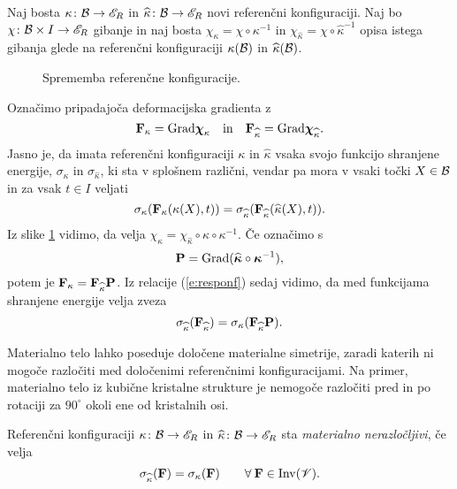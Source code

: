 Naj bosta $\kappa\colon\mathcal B\to\mathscr E_R$ in $\widehat{\kappa}\colon\mathcal B\to\mathscr E_R$ novi referenčni konfiguraciji.
Naj bo $\chi\colon\mathcal B\times I\to\mathscr E_R$ gibanje in naj bosta
$\chi_{\kappa}=\chi\circ\kappa^{-1}$ in $\chi_{\widehat{\kappa}}=\chi\circ\widehat{\kappa}^{-1}$
opisa istega gibanja glede na referenčni konfiguraciji $\kappa(\mathcal B)$ in $\widehat{\kappa}(\mathcal B)$.
\begin{figure}[h] \begin{center}
	
	\caption{Sprememba referenčne konfiguracije.}
	\label{pic:diagram}
\end{center} \end{figure}
Označimo pripadajoča deformacijska gradienta z
\[
	\mathbf F_{\kappa}=\mathrm{Grad}\boldsymbol \chi_{\kappa}\quad \mathrm{in}\quad
	\mathbf F_{\widehat{\kappa}}=\mathrm{Grad}\boldsymbol \chi_{\widehat{\kappa}}.
\]
Jasno je, da imata referenčni konfiguraciji $\kappa$ in $\widehat{\kappa}$ vsaka
svojo funkcijo shranjene energije, $\sigma_{\kappa}$ in $\sigma_{\widehat{\kappa}}$,
ki sta v splošnem različni, vendar pa mora v vsaki točki $X\in\mathcal B$ in za vsak $t\in I$ veljati
\begin{equation} \label{e:responf}
	\sigma_{\kappa}(\mathbf F_{\kappa}(\kappa(X),t))
	=\sigma_{\widehat{\kappa}}(\mathbf F_{\widehat{\kappa}}(\widehat{\kappa}(X),t)).
\end{equation}
Iz slike \ref{pic:diagram} vidimo, da velja $\chi_{\kappa}=\chi_{\widehat{\kappa}}\circ\widehat{\kappa}\circ\kappa^{-1}$.
Če označimo s
\begin{equation} \label{e:pupa}
	\mathbf P=\mathrm{Grad}(\widehat{\boldsymbol \kappa}\circ\boldsymbol \kappa^{-1}),
\end{equation}
potem je $\mathbf F_{\kappa}=\mathbf F_{\widehat{\kappa}}\mathbf P$. Iz relacije (\ref{e:responf})
sedaj vidimo, da med funkcijama shranjene energije velja zveza
\begin{equation} \label{e:dolgnoc}
	\sigma_{\widehat{\kappa}}(\mathbf F_{\widehat{\kappa}})
	=\sigma_{\kappa}(\mathbf F_{\widehat{\kappa}}\mathbf P).
\end{equation}

Materialno telo lahko poseduje določene materialne simetrije, zaradi katerih ni mogoče razločiti
med določenimi referenčnimi konfiguracijami. Na primer, materialno telo iz
kubične kristalne strukture je nemogoče razločiti pred in po rotaciji za
$90^{\circ}$ okoli ene od kristalnih osi.

\begin{definicija}
	Referenčni konfiguraciji $\kappa\colon\mathcal B\to\mathscr E_R$ in $\widehat{\kappa}\colon\mathcal B\to\mathscr E_R$
	sta \emph{materialno nerazločljivi}, če velja
	\begin{equation} \label{e:grarefc}
		\sigma_{\widehat{\kappa}}(\mathbf F)=\sigma_{\kappa}(\mathbf F)
		\qquad\forall\:\mathbf F\in\mathrm{Inv}(\mathscr V).
	\end{equation}
\end{definicija}

